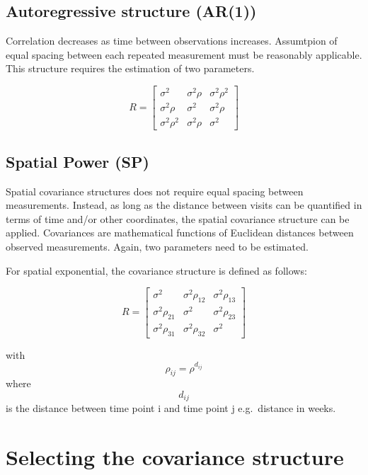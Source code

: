 \documentclass[
  letterpaper,
  DIV=11,
  numbers=noendperiod]{scrreprt}
\begin{document}
\hypertarget{autoregressive-structure-ar1}{%
\subsection{Autoregressive structure
(AR(1))}\label{autoregressive-structure-ar1}}

Correlation decreases as time between observations increases. Assumtpion
of equal spacing between each repeated measurement must be reasonably
applicable. This structure requires the estimation of two parameters.

\[ R = \begin{bmatrix}
   \sigma^2  & \sigma^2 \rho  & \sigma^2 \rho^2  \\
   \sigma^2 \rho & \sigma^2   & \sigma^2 \rho  \\
  \sigma^2 \rho^2  & \sigma^2 \rho  & \sigma^2 
   \end{bmatrix}\]

\hypertarget{spatial-power-sp}{%
\subsection{Spatial Power (SP)}\label{spatial-power-sp}}

Spatial covariance structures does not require equal spacing between
measurements. Instead, as long as the distance between visits can be
quantified in terms of time and/or other coordinates, the spatial
covariance structure can be applied. Covariances are mathematical
functions of Euclidean distances between observed measurements. Again,
two parameters need to be estimated.

For spatial exponential, the covariance structure is defined as follows:

\[ R = \begin{bmatrix}
   \sigma^2  & \sigma^2 \rho_{12}  & \sigma^2 \rho_{13}  \\
   \sigma^2 \rho_{21} & \sigma^2   & \sigma^2 \rho_{23}  \\
  \sigma^2 \rho_{31}  & \sigma^2 \rho_{32}  & \sigma^2 
   \end{bmatrix}\]

with \[ \rho_{ij}=\rho^{d_{ij}} \] where \[d_{ij} \] is the distance
between time point i and time point j e.g.~distance in weeks.

\hypertarget{selecting-the-covariance-structure}{%
\section{Selecting the covariance
structure}\label{selecting-the-covariance-structure}}
\end{document}

